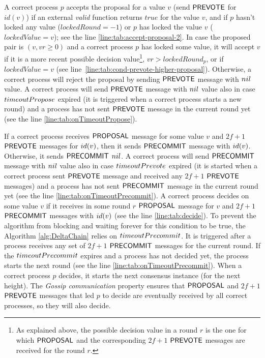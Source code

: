 A correct process $p$ accepts the proposal for a value $v$  (send $\mathsf{PREVOTE}$
for $id(v)$) if an external \emph{valid} function returns $true$ for the value
$v$, and if $p$ hasn't locked any value ($lockedRound = -1$) or $p$ has locked
the value $v$ ($lockedValue = v$); see the line
\ref{line:tab:accept-proposal-2}.  In case the proposed pair is $(v,vr \ge 0)$ and a
correct process $p$ has locked some value, it will accept
$v$ if it is a more recent possible decision value\footnote{As
explained above, the possible decision value in a round $r$ is the one for
which $\mathsf{PROPOSAL}$ and the corresponding $2f+1$ $\mathsf{PREVOTE}$ messages are received
for the round $r$.}, $vr > lockedRound_p$,  or if $lockedValue = v$ 
(see line~\ref{line:tab:cond-prevote-higher-proposal}).  Otherwise, a correct
process will reject the proposal by sending $\mathsf{PREVOTE}$ message with $nil$
value. A correct process will send $\mathsf{PREVOTE}$ message with $nil$ value also in
case $timeoutPropose$ expired (it is triggered when a correct process starts a
new round) and a process has not sent $\mathsf{PREVOTE}$ message in the current round
yet (see the line \ref{line:tab:onTimeoutPropose}). 

If a correct process receives $\mathsf{PROPOSAL}$ message for some value $v$ and $2f+1$
$\mathsf{PREVOTE}$ messages for $id(v)$, then it sends $\mathsf{PRECOMMIT}$ message with
$id(v)$. Otherwise, it sends $\mathsf{PRECOMMIT}$ $nil$. A correct process will send
$\mathsf{PRECOMMIT}$ message with $nil$ value also in case $timeoutPrevote$ expired
(it is started when a correct process sent $\mathsf{PREVOTE}$ message and received any
$2f+1$ $\mathsf{PREVOTE}$ messages)  and a process has not sent $\mathsf{PRECOMMIT}$ message in
the current round yet (see the line \ref{line:tab:onTimeoutPrecommit}).  A
correct process decides on some value $v$ if it receives in some round $r$
$\mathsf{PROPOSAL}$ message for $v$ and $2f+1$ $\mathsf{PRECOMMIT}$ messages with $id(v)$ (see
the line \ref{line:tab:decide}).  To prevent the algorithm from blocking and
waiting forever for this condition to be true, the Algorithm
\ref{alg:DeltaChain} relies on $timeoutPrecommit$. It is triggered after a
process receives any set of $2f+1$ $\mathsf{PRECOMMIT}$ messages for the current round.
If the $timeoutPrecommit$ expires and a process has not decided yet, the
process starts the next round (see the line \ref{line:tab:onTimeoutPrecommit}).
When a correct process $p$ decides, it starts the next consensus instance 
(for the next height). The \emph{Gossip communication} property ensures 
that $\mathsf{PROPOSAL}$ and $2f+1$ $\mathsf{PREVOTE}$ messages that led $p$ to decide 
are eventually received by all correct processes, so they will also decide. 

